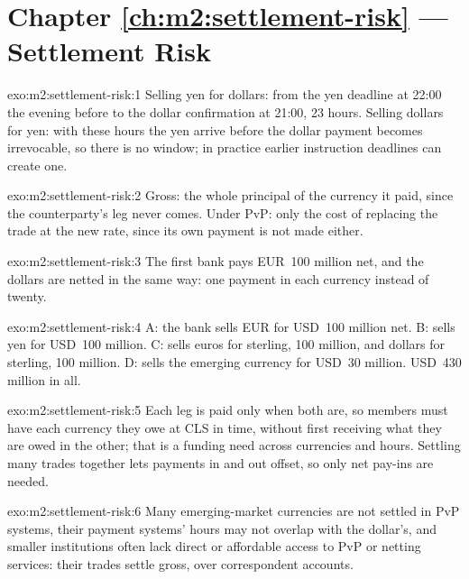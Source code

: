 \section*{Chapter \ref{ch:m2:settlement-risk} --- Settlement Risk}

\begin{solution}{exo:m2:settlement-risk:1}
Selling yen for dollars: from the yen deadline at 22:00 the evening before to the
dollar confirmation at 21:00, 23 hours. Selling dollars for yen: with these hours
the yen arrive before the dollar payment becomes irrevocable, so there is no window;
in practice earlier instruction deadlines can create one.
\end{solution}

\begin{solution}{exo:m2:settlement-risk:2}
Gross: the whole principal of the currency it paid, since the counterparty's leg
never comes. Under PvP: only the cost of replacing the trade at the new rate, since
its own payment is not made either.
\end{solution}

\begin{solution}{exo:m2:settlement-risk:3}
The first bank pays EUR~100 million net, and the dollars are netted in the same way:
one payment in each currency instead of twenty.
\end{solution}

\begin{solution}{exo:m2:settlement-risk:4}
A: the bank sells EUR for USD~100 million net. B: sells yen for USD~100 million. C:
sells euros for sterling, 100 million, and dollars for sterling, 100 million. D:
sells the emerging currency for USD~30 million. USD~430 million in all.
\end{solution}

\begin{solution}{exo:m2:settlement-risk:5}
Each leg is paid only when both are, so members must have each currency they owe
at CLS in time, without first receiving what they are owed in the other; that is a
funding need across currencies and hours. Settling many trades together lets
payments in and out offset, so only net pay-ins are needed.
\end{solution}

\begin{solution}{exo:m2:settlement-risk:6}
Many emerging-market currencies are not settled in PvP systems, their payment
systems' hours may not overlap with the dollar's, and smaller institutions often
lack direct or affordable access to PvP or netting services: their trades settle
gross, over correspondent accounts.
\end{solution}

